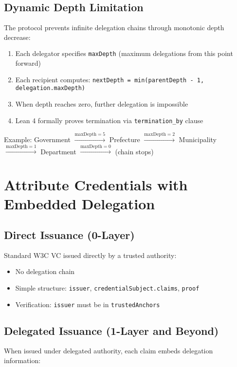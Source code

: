 \subsection{Dynamic Depth Limitation}

The protocol prevents infinite delegation chains through monotonic depth decrease:

\begin{enumerate}
  \item Each delegator specifies \texttt{maxDepth} (maximum delegations from this point forward)
  \item Each recipient computes: \texttt{nextDepth = min(parentDepth - 1, delegation.maxDepth)}
  \item When depth reaches zero, further delegation is impossible
  \item Lean 4 formally proves termination via \texttt{termination\_by} clause
\end{enumerate}

Example: Government $\xrightarrow{\text{maxDepth}=5}$ Prefecture $\xrightarrow{\text{maxDepth}=2}$ Municipality $\xrightarrow{\text{maxDepth}=1}$ Department $\xrightarrow{\text{maxDepth}=0}$ (chain stops)

\section{Attribute Credentials with Embedded Delegation}

\subsection{Direct Issuance (0-Layer)}

Standard W3C VC issued directly by a trusted authority:

\begin{itemize}
  \item No delegation chain
  \item Simple structure: \texttt{issuer}, \texttt{credentialSubject.claims}, \texttt{proof}
  \item Verification: \texttt{issuer} must be in \texttt{trustedAnchors}
\end{itemize}

\subsection{Delegated Issuance (1-Layer and Beyond)}

When issued under delegated authority, each claim embeds delegation information:

